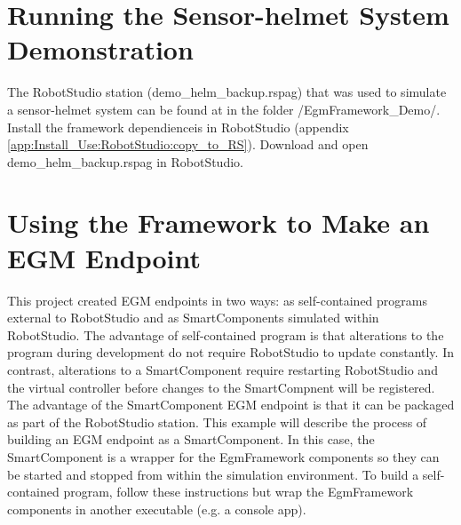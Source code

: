 \documentclass{cslthse-msc}
\begin{document}
\begin{appendices}
\section{Running the Sensor-helmet System Demonstration}
\label{app:Install_Use:Run_Demo}
The RobotStudio station (demo\_helm\_backup.rspag) that was used to simulate a sensor-helmet system can be found at \cite{Greg:Ref_Repo} in the folder /EgmFramework\_Demo/. Install the framework dependienceis in RobotStudio (appendix \ref{app:Install_Use:RobotStudio:copy_to_RS}). Download and open demo\_helm\_backup.rspag in RobotStudio. 


\section{Using the Framework to Make an EGM Endpoint}
\label{app:Install_Use:Endpoint_Framewrok}
This project created EGM endpoints in two ways: as self-contained programs external to RobotStudio and as SmartComponents simulated within RobotStudio. The advantage of self-contained program is that alterations to the program during development do not require RobotStudio to update constantly. In contrast, alterations to a SmartComponent require restarting RobotStudio and the virtual controller before changes to the SmartCompnent will be registered. The advantage of the SmartComponent EGM endpoint is that it can be packaged as part of the RobotStudio station. This example will describe the process of building an EGM endpoint as a SmartComponent. In this case, the SmartComponent is a wrapper for the EgmFramework components so they can be started and stopped from within the simulation environment. To build a self-contained program, follow these instructions but wrap the EgmFramework components in another executable (e.g. a console app).\par 


\end{appendices}
\end{document}
